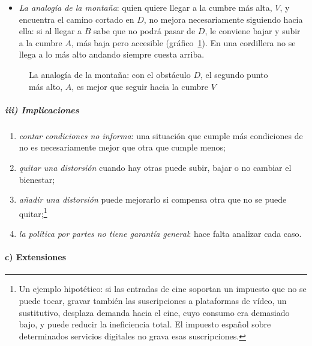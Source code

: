 \documentclass[11pt]{article}
\begin{document}
\begin{itemize}
\item \emph{La analogía de la montaña}: quien quiere llegar a la cumbre más alta, $V$, y encuentra el camino cortado en $D$, no mejora necesariamente siguiendo hacia ella: si al llegar a $B$ sabe que no podrá pasar de $D$, le conviene bajar y subir a la cumbre $A$, más baja pero accesible (gráfico~\ref{fig:montana-second-best}). En una cordillera no se llega a lo más alto andando siempre cuesta arriba.
\end{itemize}

\begin{figure}[H]
\centering
\caption{La analogía de la montaña: con el obstáculo $D$, el segundo punto más alto, $A$, es mejor que seguir hacia la cumbre $V$}\label{fig:montana-second-best}
\end{figure}

\subparagraph{iii) Implicaciones}

\begin{enumerate}
\item \emph{contar condiciones no informa}: una situación que cumple más condiciones de  no es necesariamente mejor que otra que cumple menos;
\item \emph{quitar una distorsión} cuando hay otras puede subir, bajar o no cambiar el bienestar;
\item \emph{añadir una distorsión} puede mejorarlo si compensa otra que no se puede quitar;\footnote{Un ejemplo hipotético: si las entradas de cine soportan un impuesto que no se puede tocar, gravar también las suscripciones a plataformas de vídeo, un sustitutivo, desplaza demanda hacia el cine, cuyo consumo era demasiado bajo, y puede reducir la ineficiencia total. El impuesto español sobre determinados servicios digitales no grava esas suscripciones\nocite{BOE2020IDSD}.}
\item \emph{la política por partes no tiene garantía general}: hace falta analizar cada caso.
\end{enumerate}

\paragraph{c) Extensiones}
\end{document}
